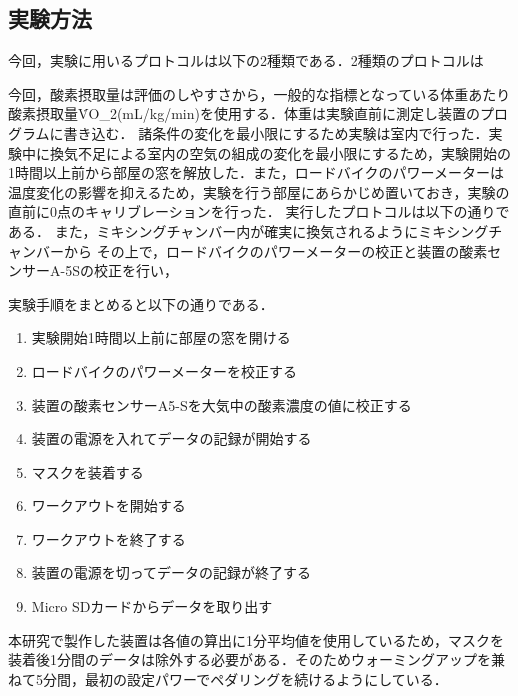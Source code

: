 

\subsection{実験方法}

今回，実験に用いるプロトコルは以下の2種類である．2種類のプロトコルは

今回，酸素摂取量は評価のしやすさから，一般的な指標となっている体重あたり酸素摂取量\.{V}O_2(mL/kg/min)を使用する．体重は実験直前に測定し装置のプログラムに書き込む．
諸条件の変化を最小限にするため実験は室内で行った．実験中に換気不足による室内の空気の組成の変化を最小限にするため，実験開始の1時間以上前から部屋の窓を解放した．また，ロードバイクのパワーメーターは温度変化の影響を抑えるため，実験を行う部屋にあらかじめ置いておき，実験の直前に0点のキャリブレーションを行った．
実行したプロトコルは以下の通りである．
また，ミキシングチャンバー内が確実に換気されるようにミキシングチャンバーから
その上で，ロードバイクのパワーメーターの校正と装置の酸素センサーA-5Sの校正を行い，

実験手順をまとめると以下の通りである．

\begin{enumerate}
  \item 実験開始1時間以上前に部屋の窓を開ける
  \item ロードバイクのパワーメーターを校正する
  \item 装置の酸素センサーA5-Sを大気中の酸素濃度の値に校正する
  \item 装置の電源を入れてデータの記録が開始する
  \item マスクを装着する
  \item ワークアウトを開始する
  \item ワークアウトを終了する
  \item 装置の電源を切ってデータの記録が終了する
  \item Micro SDカードからデータを取り出す
\end{enumerate}

本研究で製作した装置は各値の算出に1分平均値を使用しているため，マスクを装着後1分間のデータは除外する必要がある．そのためウォーミングアップを兼ねて5分間，最初の設定パワーでペダリングを続けるようにしている．

